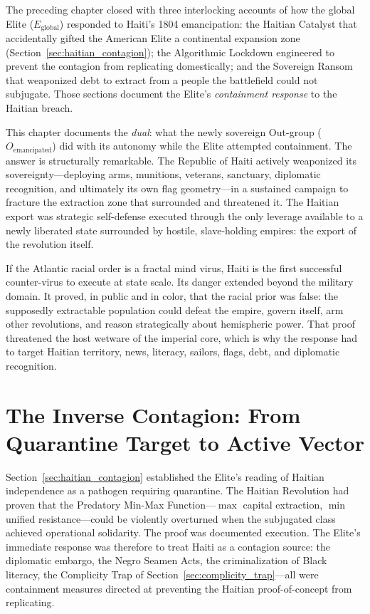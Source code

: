\medskip

The preceding chapter closed with three interlocking accounts of how the global Elite ($E_{\text{global}}$) responded to Haiti's 1804 emancipation: the Haitian Catalyst that accidentally gifted the American Elite a continental expansion zone (Section~\ref{sec:haitian_contagion}); the Algorithmic Lockdown engineered to prevent the contagion from replicating domestically; and the Sovereign Ransom that weaponized debt to extract from a people the battlefield could not subjugate. Those sections document the Elite's \textit{containment response} to the Haitian breach.

This chapter documents the \textit{dual}: what the newly sovereign Out-group ($O_{\text{emancipated}}$) did with its autonomy while the Elite attempted containment. The answer is structurally remarkable. The Republic of Haiti actively weaponized its sovereignty---deploying arms, munitions, veterans, sanctuary, diplomatic recognition, and ultimately its own flag geometry---in a sustained campaign to fracture the extraction zone that surrounded and threatened it. The Haitian export was strategic self-defense executed through the only leverage available to a newly liberated state surrounded by hostile, slave-holding empires: the export of the revolution itself.

If the Atlantic racial order is a fractal mind virus, Haiti is the first successful counter-virus to execute at state scale. Its danger extended beyond the military domain. It proved, in public and in color, that the racial prior was false: the supposedly extractable population could defeat the empire, govern itself, arm other revolutions, and reason strategically about hemispheric power. That proof threatened the host wetware of the imperial core, which is why the response had to target Haitian territory, news, literacy, sailors, flags, debt, and diplomatic recognition.

\section{The Inverse Contagion: From Quarantine Target to Active Vector}
\label{sec:inverse_contagion}

Section~\ref{sec:haitian_contagion} established the Elite's reading of Haitian independence as a pathogen requiring quarantine. The Haitian Revolution had proven that the Predatory Min-Max Function---$\max$ capital extraction, $\min$ unified resistance---could be violently overturned when the subjugated class achieved operational solidarity. The proof was documented execution. The Elite's immediate response was therefore to treat Haiti as a contagion source: the diplomatic embargo, the Negro Seamen Acts, the criminalization of Black literacy, the Complicity Trap of Section~\ref{sec:complicity_trap}---all were containment measures directed at preventing the Haitian proof-of-concept from replicating.

